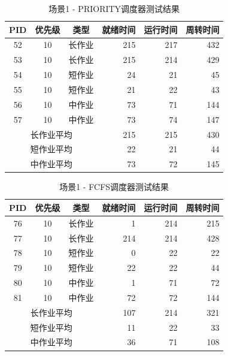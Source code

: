 \documentclass[a4paper, 12pt]{article}
\begin{document}
\begin{table}[H]
	\centering
	\caption{场景1 - PRIORITY调度器测试结果}
	\begin{tabular}{cccrrr}
		\toprule
		\textbf{PID} & \textbf{优先级} & \textbf{类型} & \textbf{就绪时间} & \textbf{运行时间} & \textbf{周转时间} \\
		\midrule
		52 & 10 & 长作业 & 215 & 217 & 432 \\
		53 & 10 & 长作业 & 215 & 214 & 429 \\
		54 & 10 & 短作业 & 24 & 21 & 45 \\
		55 & 10 & 短作业 & 21 & 22 & 43 \\
		56 & 10 & 中作业 & 73 & 71 & 144 \\
		57 & 10 & 中作业 & 73 & 74 & 147 \\
		\midrule
		\multicolumn{3}{c}{长作业平均} & 215 & 215 & 430 \\
		\multicolumn{3}{c}{短作业平均} & 22 & 21 & 44 \\
		\multicolumn{3}{c}{中作业平均} & 73 & 72 & 145 \\
		\bottomrule
	\end{tabular}
\end{table}

\begin{table}[H]
	\centering
	\caption{场景1 - FCFS调度器测试结果}
	\begin{tabular}{cccrrr}
		\toprule
		\textbf{PID} & \textbf{优先级} & \textbf{类型} & \textbf{就绪时间} & \textbf{运行时间} & \textbf{周转时间} \\
		\midrule
		76 & 10 & 长作业 & 1 & 214 & 215 \\
		77 & 10 & 长作业 & 214 & 214 & 428 \\
		78 & 10 & 短作业 & 0 & 22 & 22 \\
		79 & 10 & 短作业 & 22 & 22 & 44 \\
		80 & 10 & 中作业 & 1 & 71 & 72 \\
		81 & 10 & 中作业 & 72 & 72 & 144 \\
		\midrule
		\multicolumn{3}{c}{长作业平均} & 107 & 214 & 321 \\
		\multicolumn{3}{c}{短作业平均} & 11 & 22 & 33 \\
		\multicolumn{3}{c}{中作业平均} & 36 & 71 & 108 \\
		\bottomrule
	\end{tabular}
\end{table}
\end{document}
